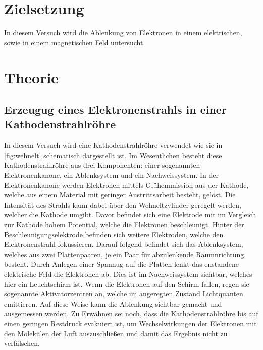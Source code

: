 \section{Zielsetzung}
    In diesem Versuch wird die Ablenkung von Elektronen in einem elektrischen, sowie in einem magnetischen Feld untersucht.

\section{Theorie}
\label{sec:Theorie}
    \subsection{Erzeugug eines Elektronenstrahls in einer Kathodenstrahlröhre}
    In diesem Versuch wird eine Kathodenstrahlröhre verwendet wie sie in \autoref{fig:wehnelt} schematisch dargestellt ist.
    Im Wesentlichen besteht diese Kathodenstrahlröhre aus drei Komponenten: einer sogenannten Elektronenkanone, ein Ablenksystem und ein 
    Nachweissystem. In der Elektronenkanone werden Elektronen mittels Glühemmission aus der Kathode, welche aus einem Material mit 
    geringer Austrittsarbeit besteht, gelöst. Die Intensität des Strahls kann dabei über den Wehneltzylinder geregelt werden, welcher die
    Kathode umgibt. Davor befindet sich eine Elektrode mit im Vergleich zur Kathode hohem Potential, welche die Elektronen beschleunigt.
    Hinter der Beschleunigungselektrode befinden sich weitere Elektroden, welche den Elektronenstrahl fokussieren. Darauf folgend befindet sich das 
    Ablenksystem, welches aus zwei Plattenpaaren, je ein Paar für abzulenkende Raumnrichtung, besteht. Durch Anlegen einer Spannug auf die
    Platten lenkt das enstandene elektrische Feld die Elektronen ab. Dies ist im Nachweissystem sichtbar, welches hier ein Leuchtschirm ist.
    Wenn die Elektronen auf den Schirm fallen, regen sie sogenannte Aktivatorzentren an, welche im angeregten Zustand Lichtquanten emittieren.
    Auf diese Weise kann die Ablenkung sichtbar gemacht und ausgemessen werden.
    Zu Erwähnen sei noch, dass die Kathodenstrahlröhre bis auf einen geringen Restdruck evakuiert ist, um Wechselwirkungen der Elektronen mit 
    den Molekülen der Luft auszuschließen und damit das Ergebnis nicht zu verfälschen.
